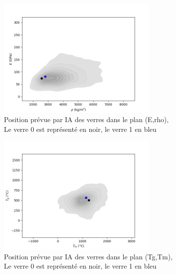 \documentclass{article}
\begin{document}
\begin{figure}[ht]
    \centering
    \includegraphics[width=0.7\textwidth]{photos/E rho.png}
    \caption{Position prévue par IA des verres dans le plan (E,rho),\\ Le verre 0 est représenté en noir, le verre 1 en bleu}
\end{figure}

\begin{figure}[ht]
    \centering
    \includegraphics[width=0.7\textwidth]{photos/Tg Tm.png}
    \caption{Position prévue par IA des verres dans le plan (Tg,Tm),\\ Le verre 0 est représenté en noir, le verre 1 en bleu}
\end{figure}
\end{document}
